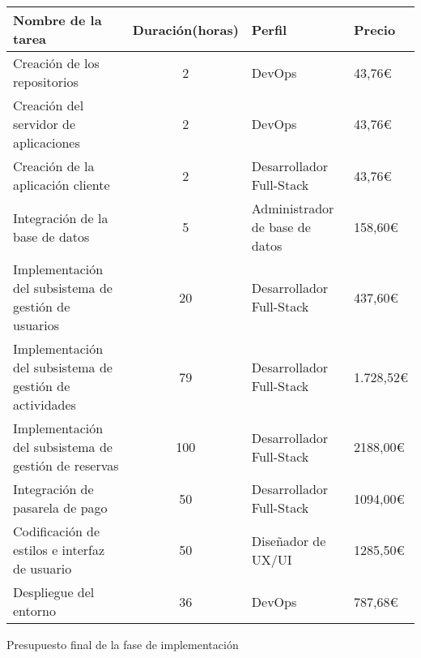 \begin{planificacion}
	\centering
	\begin{tabular}{ | m{8.5cm} | c | m{2.5cm} |  m{1.5cm} |}
		\hline
		\textbf{Nombre de la tarea}                             & \textbf{Duración(horas)} & \textbf{Perfil}                & \textbf{Precio} \\\hline
		Creación de los repositorios                            & 2                        & DevOps                         & 43,76€          \\\hline
		Creación del servidor de aplicaciones                   & 2                        & DevOps                         & 43,76€          \\\hline
		Creación de la aplicación cliente                       & 2                        & Desarrollador Full-Stack       & 43,76€          \\\hline
		Integración de la base de datos                         & 5                        & Administrador de base de datos & 158,60€         \\\hline
		Implementación del subsistema de gestión de usuarios    & 20                       & Desarrollador Full-Stack       & 437,60€         \\\hline
		Implementación del subsistema de gestión de actividades & 79                       & Desarrollador Full-Stack       & 1.728,52€       \\\hline
		Implementación del subsistema de gestión de reservas    & 100                      & Desarrollador Full-Stack       & 2188,00€        \\\hline
		Integración de pasarela de pago                         & 50                       & Desarrollador Full-Stack       & 1094,00€        \\\hline
		Codificación de estilos e interfaz de usuario           & 50                       & Diseñador de UX/UI             & 1285,50€        \\\hline
		Despliegue del entorno                                  & 36                       & DevOps                         & 787,68€         \\\hline
	\end{tabular}
	\caption{Presupuesto final de la fase de implementación}
\end{planificacion}


